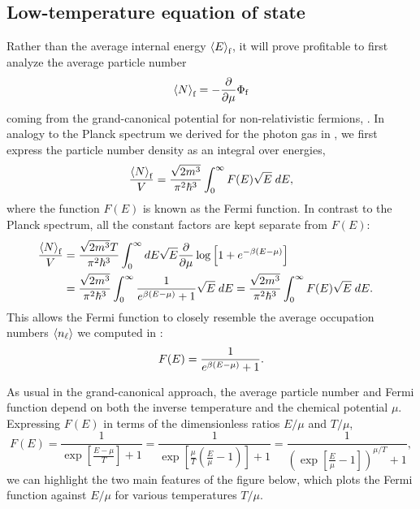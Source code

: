 \subsection{Low-temperature equation of state}
Rather than the average internal energy $\left\langle E \right\rangle_{\text{f}}$, it will prove profitable to first analyze the average particle number
\begin{equation*}
  \left\langle N \right\rangle_{\text{f}} = -\frac{\partial }{\partial \mu} \Phi_{\text{f}}
\end{equation*}
coming from the grand-canonical potential for non-relativistic fermions, .
In analogy to the Planck spectrum we derived for the photon gas in , we first express the particle number density as an integral over energies,
\begin{equation*}
  \frac{\left\langle N \right\rangle_{\text{f}}}{V} = \frac{\sqrt{2m^3}}{\pi^2 \hbar^3} \int_0^{\infty} F(E) \sqrt{E} \; dE,
\end{equation*}
where the function $F(E)$ is known as the Fermi function.
In contrast to the Planck spectrum, all the constant factors are kept separate from $F(E)$:
\begin{align}
  \frac{\left\langle N \right\rangle_{\text{f}}}{V} & = \frac{\sqrt{2m^3} T}{\pi^2 \hbar^3} \int_0^{\infty} dE \sqrt{E} \frac{\partial }{\partial \mu} \log\left[1 + e^{-\beta(E - \mu)}\right] \cr
                               & = \frac{\sqrt{2m^3}}{\pi^2 \hbar^3} \int_0^{\infty} \frac{1}{e^{\beta(E - \mu)} + 1} \sqrt{E} \; dE = \frac{\sqrt{2m^3}}{\pi^2 \hbar^3} \int_0^{\infty} F(E) \sqrt{E} \; dE. \label{eq:N_fermi}
\end{align}
This allows the Fermi function to closely resemble the average occupation numbers $\left\langle n_{\ell} \right\rangle$ we computed in :
\begin{equation}
  \label{eq:Fermi_func}
  F(E) = \frac{1}{e^{\beta(E - \mu)} + 1}.
\end{equation}

As usual in the grand-canonical approach, the average particle number and Fermi function depend on both the inverse temperature \be and the chemical potential $\mu$.
Expressing $F(E)$ in terms of the dimensionless ratios $E / \mu$ and $T / \mu$,
\begin{equation*}
  F(E) = \frac{1}{\exp\left[\frac{E - \mu}{T}\right] + 1} = \frac{1}{\exp\left[\frac{\mu}{T}\left(\frac{E}{\mu} - 1\right)\right] + 1} = \frac{1}{\left(\exp\left[\frac{E}{\mu} - 1\right]\right)^{\mu / T} + 1},
\end{equation*}
we can highlight the two main features of the figure below, which plots the Fermi function against $E / \mu$ for various temperatures $T / \mu$.

